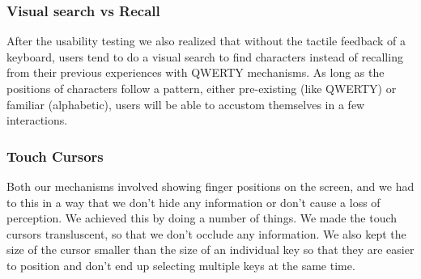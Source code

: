 \subsubsection{Visual search vs Recall}

After the usability testing we also realized that without the tactile feedback of a keyboard, users tend to do a
visual search to find characters instead of recalling from their
previous experiences with QWERTY mechanisms. As long as
the positions of characters follow a pattern, either pre-existing
(like QWERTY) or familiar (alphabetic), users will be able to accustom
themselves in a few interactions.

\subsubsection{Touch Cursors}

Both our mechanisms involved showing finger positions on the screen,
and we had to this in a way that we don't hide any information or
don't cause a loss of perception. We achieved this by doing a number
of things. We made the touch cursors transluscent, so that we don't
occlude any information. We also kept the size of the cursor smaller
than the size of an individual key so that they are easier to position
and don't end up selecting multiple keys at the same time.
